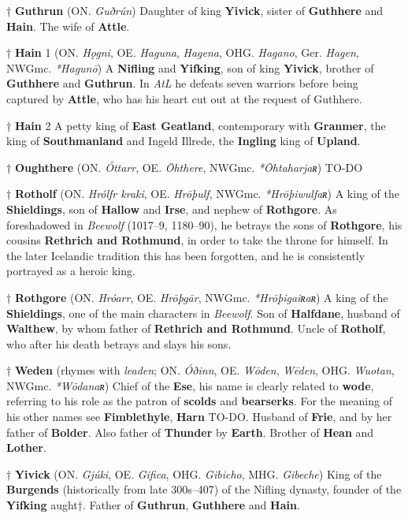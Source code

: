† \textbf{Guthrun} (ON. \emph{Guðrún})
 Daughter of king \textbf{Yivick}, sister of \textbf{Guthhere} and \textbf{Hain}. The wife of \textbf{Attle}.

† \textbf{Hain} 1 (ON. \emph{Hǫgni}, OE. \emph{Haguna}, \emph{Hagena}, OHG. \emph{Hagano}, Ger. \emph{Hagen}, NWGmc. \emph{*Hagunō})
 A \textbf{Nifling} and \textbf{Yifking}, son of king \textbf{Yivick}, brother of \textbf{Guthhere} and \textbf{Guthrun}. In \emph{AtL} he defeats seven warriors before being captured by \textbf{Attle}, who has his heart cut out at the request of Guthhere.
 
† \textbf{Hain} 2 A petty king of \textbf{East Geatland}, contemporary with \textbf{Granmer}, the king of \textbf{Southmanland} and Ingeld Illrede, the \textbf{Ingling} king of \textbf{Upland}.
 
† \textbf{Oughthere} (ON. \emph{Óttarr}, OE. \emph{Ōhthere}, NWGmc. \emph{*Ōhtaharjaʀ})
 TO-DO
 
† \textbf{Rotholf} (ON. \emph{Hrólfr kraki}, OE. \emph{Hrōþulf}, NWGmc. \emph{*Hrōþiwulfaʀ})
 A king of the \textbf{Shieldings}, son of \textbf{Hallow} and \textbf{Irse}, and nephew of \textbf{Rothgore}. As foreshadowed in \emph{Beewolf} (1017–9, 1180–90), he betrays the sons of \textbf{Rothgore}, his cousins \textbf{Rethrich and Rothmund}, in order to take the throne for himself. In the later Icelandic tradition this has been forgotten, and he is consistently portrayed as a heroic king.
 
† \textbf{Rothgore} (ON. \emph{Hróarr}, OE. \emph{Hrōþgār}, NWGmc. \emph{*Hrōþigaiʀaʀ})
 A king of the \textbf{Shieldings}, one of the main characters in \emph{Beewolf}. Son of \textbf{Halfdane}, husband of \textbf{Walthew}, by whom father of \textbf{Rethrich and Rothmund}. Uncle of \textbf{Rotholf}, who after his death betrays and slays his sons.
 
† \textbf{Weden} (rhymes with \emph{leaden}; ON. \emph{Óðinn}, OE. \emph{Wōden}, \emph{Wēden}, OHG. \emph{Wuotan}, NWGmc. \emph{*Wōdanaʀ})
 Chief of the \textbf{Ese}, his name is clearly related to \textbf{wode}, referring to his role as the patron of \textbf{scolds} and \textbf{bearserks}. For the meaning of his other names see \textbf{Fimblethyle}, \textbf{Harn} TO-DO. Husband of \textbf{Frie}, and by her father of \textbf{Bolder}. Also father of \textbf{Thunder} by \textbf{Earth}. Brother of \textbf{Hean} and \textbf{Lother}.

† \textbf{Yivick} (ON. \emph{Gjúki}, OE. \emph{Gifica}, OHG. \emph{Gibicho}, MHG. \emph{Gibeche})
 King of the \textbf{Burgends} (historically from late 300s–407) of the Nifling dynasty, founder of the \textbf{Yifking} aught†. Father of \textbf{Guthrun}, \textbf{Guthhere} and \textbf{Hain}.



